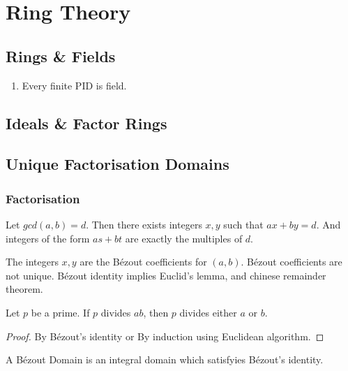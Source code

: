 \chapter{Ring Theory}

\section{Rings \& Fields}
\begin{enumerate}
	\item Every finite PID is field.
\end{enumerate}

\section{Ideals \& Factor Rings}

\section{Unique Factorisation Domains}
\subsection{Factorisation}
\begin{lemma}[B\'ezout]
	Let $gcd(a,b) = d$. Then there exists integers $x,y$ such that $ax+by = d$. And integers of the form $as+bt$ are exactly the multiples of $d$.
\end{lemma}

	The integers $x,y$ are the B\'ezout coefficients for $(a,b)$. B\'ezout coefficients are not unique.
	B\'ezout identity implies Euclid's lemma, and chinese remainder theorem.

\begin{lemma}[Euclid]
	Let $p$ be a prime. If $p$ divides $ab$, then $p$ divides either $a$ or $b$.
\end{lemma}
\begin{proof}
	By B\'ezout's identity or By induction using Euclidean algorithm.
\end{proof}

\begin{theorem}

\end{theorem}

\begin{definition}
	A B\'ezout Domain is an integral domain which satisfyies B\'ezout's identity.
\end{definition}

